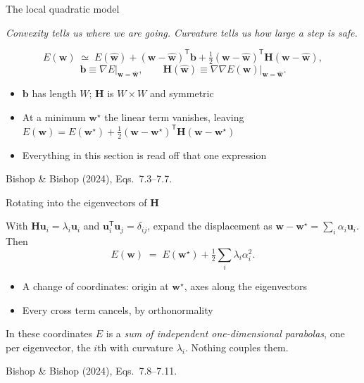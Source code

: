 \documentclass[aspectratio=169, 11pt]{beamer}
\newcommand{\bridge}[1]{%
  {\scriptsize\itshape\color{mcMuted} #1\par}\vspace{0.35em}}
\newcommand{\srcline}[1]{%
  \par\vspace{0.25em}%
  {\scriptsize\color{mcMuted}\hfill #1\par}}
\newcommand{\src}[3]{}      %
\begin{document}
\begin{frame}{The local quadratic model}
  \src{bishop2024}{equation}{7.3-7.7}
  \src{bishop2024}{section}{7.1.1}
  \bridge{Convexity tells us where we are going. Curvature tells us how
  large a step is safe.}
  \vspace{-0.35em}
  \[
    E(\mathbf{w}) \;\simeq\; E(\hat{\mathbf{w}}) + (\mathbf{w} - \hat{\mathbf{w}})^{\mathsf T} \mathbf{b}
          + \tfrac12 (\mathbf{w} - \hat{\mathbf{w}})^{\mathsf T} \mathbf{H} (\mathbf{w} - \hat{\mathbf{w}}),
  \]
  \vspace{-1.0em}
  \[
    \mathbf{b} \equiv \nabla E \big|_{\mathbf{w} = \hat{\mathbf{w}}},
    \qquad
    \mathbf{H}(\hat{\mathbf{w}}) \equiv \nabla\nabla E(\mathbf{w}) \big|_{\mathbf{w} = \hat{\mathbf{w}}} .
  \]
  \vspace{-0.5em}
  \begin{itemize}\itemsep0.35em
    \item $\mathbf{b}$ has length $W$; $\mathbf{H}$ is $W \times W$ and symmetric
    \item At a minimum $\mathbf{w}^\star$ the linear term vanishes, leaving
          $E(\mathbf{w}) = E(\mathbf{w}^\star)
           + \tfrac12 (\mathbf{w}-\mathbf{w}^\star)^{\mathsf T} \mathbf{H} (\mathbf{w}-\mathbf{w}^\star)$
    \item Everything in this section is read off that one expression
  \end{itemize}
  \srcline{Bishop \& Bishop (2024), Eqs.~7.3--7.7.}
\end{frame}

\begin{frame}{Rotating into the eigenvectors of $\mathbf{H}$}
  \src{bishop2024}{equation}{7.8-7.11}
  \src{bishop2024}{section}{7.1.1}
  \vspace{0.1em}
  With $\mathbf{H} \mathbf{u}_i = \lambda_i \mathbf{u}_i$ and $\mathbf{u}_i^{\mathsf T} \mathbf{u}_j = \delta_{ij}$,
  expand the displacement as
  $\mathbf{w} - \mathbf{w}^\star = \sum_i \alpha_i \mathbf{u}_i$. Then
  \vspace{-0.35em}
  \[
    E(\mathbf{w}) \;=\; E(\mathbf{w}^\star) + \tfrac12 \sum_i \lambda_i \alpha_i^2 .
  \]
  \vspace{-0.6em}
  \begin{itemize}\itemsep0.35em
    \item A change of coordinates: origin at $\mathbf{w}^\star$, axes along the
          eigenvectors
    \item Every cross term cancels, by orthonormality
  \end{itemize}
  \begin{redhighlight}
    In these coordinates $E$ is a \emph{sum of independent
    one-dimensional parabolas}, one per eigenvector, the $i$th with
    curvature $\lambda_i$. Nothing couples them.
  \end{redhighlight}
  \srcline{Bishop \& Bishop (2024), Eqs.~7.8--7.11.}
\end{frame}
\end{document}
